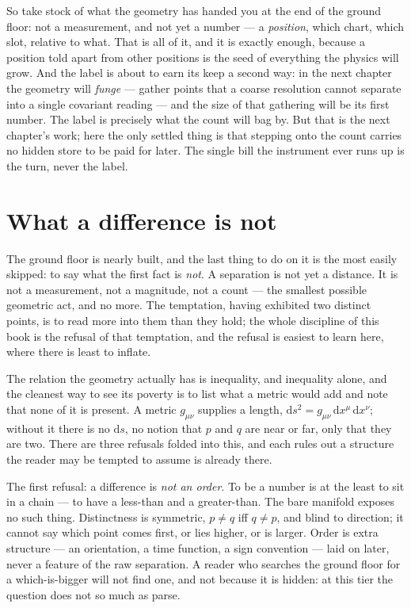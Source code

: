 So take stock of what the geometry has handed you at the end of the ground floor: not a measurement, and not yet a number ---
a \emph{position}, which chart, which slot, relative to what. That is all of it, and it is exactly enough, because a position
told apart from other positions is the seed of everything the physics will grow. And the label is about to earn its keep a
second way: in the next chapter the geometry will \emph{funge} --- gather points that a coarse resolution cannot separate
into a single covariant reading --- and the size of that gathering will be its first number. The label is precisely what the
count will bag by. But that is the next chapter's work; here the only settled thing is that stepping onto the count carries
no hidden store to be paid for later. The single bill the instrument ever runs up is the turn, never the label.

\section{What a difference is not}

The ground floor is nearly built, and the last thing to do on it is the most easily skipped: to say what the first fact is
\emph{not}. A separation is not yet a distance. It is not a measurement, not a magnitude, not a count --- the smallest
possible geometric act, and no more. The temptation, having exhibited two distinct points, is to read more into them than
they hold; the whole discipline of this book is the refusal of that temptation, and the refusal is easiest to learn here,
where there is least to inflate.

The relation the geometry actually has is inequality, and inequality alone, and the cleanest way to see its poverty is to
list what a metric would add and note that none of it is present. A metric $g_{\mu\nu}$ supplies a length, $\mathrm{d}s^2 =
g_{\mu\nu}\,\mathrm{d}x^\mu\,\mathrm{d}x^\nu$; without it there is no $\mathrm{d}s$, no notion that $p$ and $q$ are near or
far, only that they are two. There are three refusals folded into this, and each rules out a structure the reader may be
tempted to assume is already there.

The first refusal: a difference is \emph{not an order}. To be a number is at the least to sit in a chain --- to have a
less-than and a greater-than. The bare manifold exposes no such thing. Distinctness is symmetric, $p \neq q$ iff $q \neq p$,
and blind to direction; it cannot say which point comes first, or lies higher, or is larger. Order is extra structure --- an
orientation, a time function, a sign convention --- laid on later, never a feature of the raw separation. A reader who
searches the ground floor for a which-is-bigger will not find one, and not because it is hidden: at this tier the question
does not so much as parse.

